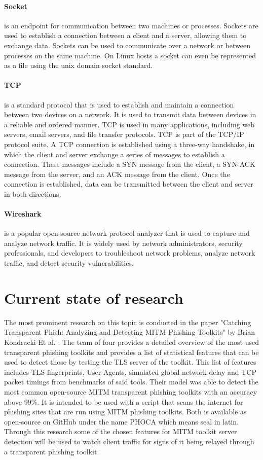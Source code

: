 \documentclass[12pt]{scrbook}
\begin{document}
\paragraph{Socket} is an endpoint for communication between two machines or
processes. Sockets are used to establish a connection between a client and a
server, allowing them to exchange data. Sockets can be used to communicate over
a network or between processes on the same machine. On Linux hosts a socket can
even be represented as a file using the unix domain socket standard.

\paragraph{TCP} is a standard protocol that is used to establish and maintain a
connection between
two devices on a network. It is used to transmit data between devices in a
reliable and ordered manner. TCP is used in many applications, including web
servers,
email servers, and file transfer protocols. TCP is part of the TCP/IP protocol
suite.
A TCP connection is established using a three-way handshake, in which the client
and server
exchange a series of messages to establish a connection. These messages include
a SYN message
from the client, a SYN-ACK message from the server, and an ACK message from the
client.
Once the connection is established, data can be transmitted between the client
and server in both directions.

\paragraph{Wireshark} is a popular open-source network protocol
analyzer that is used to capture and analyze network traffic. It is widely used
by network administrators, security professionals, and developers to
troubleshoot network problems, analyze network traffic, and detect security
vulnerabilities.

\newpage \section{Current state of research}
The most prominent research on this topic is conducted in the paper
"Catching Transparent Phish: Analyzing and Detecting MITM Phishing Toolkits"
by Brian Kondracki Et al. \cite{kondracki2021catching}.
The team of four provides a detailed overview of the most used transparent
phishing toolkits and provides a list of statistical features that can be used to detect
those by testing the TLS server of the toolkit.
This list of features includes TLS fingerprints, User-Agents, simulated global
network delay and TCP packet timings from benchmarks of said tools.
Their model was able to detect the most common open-source MITM transparent
phishing toolkits with an accuracy above 99\%.
It is intended to be used with a script that scans the internet for phishing
sites that are run using MITM phishing toolkits.
Both is available as open-source on GitHub under the name PHOCA which means seal
in latin.\cite{kondracki2021catchingGit}
Through this research some of the chosen features for MITM toolkit server
detection will be used to watch client traffic for signs of it being relayed
through a transparent phishing toolkit.
\end{document}
